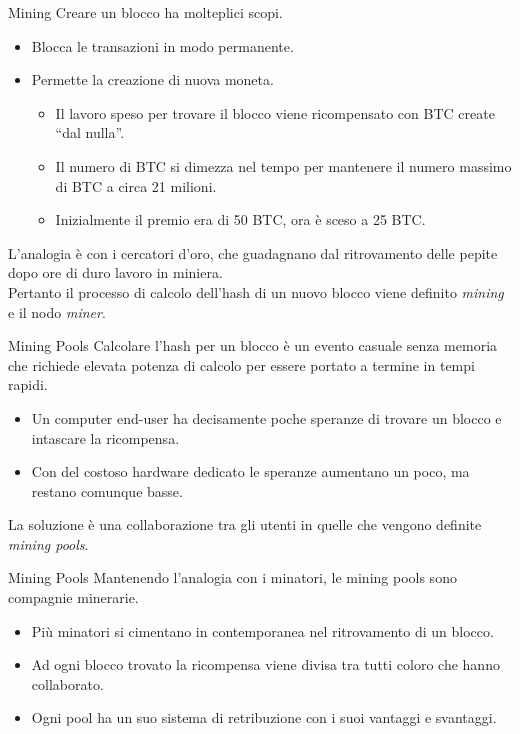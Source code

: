 \documentclass[italian]{beamer}
\begin{document}
\begin{frame}{Mining}
Creare un blocco ha molteplici scopi.
\pause
\begin{itemize}
  \item Blocca le transazioni in modo permanente.
  \item Permette la creazione di nuova moneta.
  \begin{itemize}
    \item Il lavoro speso per trovare il blocco viene ricompensato con BTC create ``dal nulla''.
    \item Il numero di BTC si dimezza nel tempo per mantenere il numero massimo di BTC a circa 21 milioni.
    \item Inizialmente il premio era di 50 BTC, ora è sceso a 25 BTC.
  \end{itemize}
\end{itemize}
\bigskip
\pause L'analogia è con i cercatori d'oro, che guadagnano dal ritrovamento delle pepite dopo ore di duro lavoro in miniera. \\
\pause Pertanto il processo di calcolo dell'hash di un nuovo blocco viene definito \emph{mining} e il nodo \emph{miner}.
\end{frame}

\begin{frame}{Mining Pools}
  Calcolare l'hash per un blocco è un evento casuale senza memoria che richiede elevata potenza di calcolo per essere portato a termine in tempi rapidi.
 \begin{itemize}
  \item Un computer end-user ha decisamente poche speranze di trovare un blocco e intascare la ricompensa.
  \item Con del costoso hardware dedicato le speranze aumentano un poco, ma restano comunque basse.
 \end{itemize}
 \bigskip
 \pause La soluzione è una collaborazione tra gli utenti in quelle che vengono definite \emph{mining pools}.
\end{frame}

\begin{frame}{Mining Pools}
  Mantenendo l'analogia con i minatori, le mining pools sono compagnie minerarie.
 \begin{itemize}
  \item Più minatori si cimentano in contemporanea nel ritrovamento di un blocco.
  \item Ad ogni blocco trovato la ricompensa viene divisa tra tutti coloro che hanno collaborato.
  \item Ogni pool ha un suo sistema di retribuzione con i suoi vantaggi e svantaggi.
 \end{itemize}
\end{frame}
\end{document}
